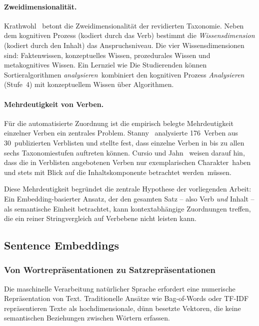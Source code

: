 \paragraph{Zweidimensionalität.}

Krathwohl~\cite{krathwohl2002revision} betont die Zweidimensionalität der revidierten Taxonomie.
Neben dem kognitiven Prozess (kodiert durch das Verb) bestimmt die \emph{Wissensdimension} (kodiert durch den Inhalt) das Anspruchsniveau.
Die vier Wissensdimensionen sind: Faktenwissen, konzeptuelles Wissen, prozedurales Wissen und metakognitives Wissen.
Ein Lernziel wie \glqq Die Studierenden können Sortieralgorithmen \emph{analysieren}\grqq\ kombiniert den kognitiven Prozess \emph{Analysieren} (Stufe~4) mit konzeptuellem Wissen über Algorithmen.

\paragraph{Mehrdeutigkeit von Verben.}

Für die automatisierte Zuordnung ist die empirisch belegte Mehrdeutigkeit einzelner Verben ein zentrales Problem.
Stanny~\cite{stanny2016reevaluating} analysierte 176~Verben aus 30~publizierten Verblisten und stellte fest, dass einzelne Verben in bis zu allen sechs Taxonomiestufen auftreten können.
Cursio und Jahn~\cite{cursio2013leitfaden} weisen darauf hin, dass die in Verblisten angebotenen Verben \glqq nur exemplarischen Charakter\grqq\ haben und \glqq stets mit Blick auf die Inhaltskomponente betrachtet werden\grqq\ müssen.

Diese Mehrdeutigkeit begründet die zentrale Hypothese der vorliegenden Arbeit: Ein Embedding-basierter Ansatz, der den gesamten Satz -- also Verb \emph{und} Inhalt -- als semantische Einheit betrachtet, kann kontextabhängige Zuordnungen treffen, die ein reiner Stringvergleich auf Verbebene nicht leisten kann.

%
\subsection{Sentence Embeddings}\label{sec:grundlagen-embeddings}

\subsubsection{Von Wortrepräsentationen zu Satzrepräsentationen}

Die maschinelle Verarbeitung natürlicher Sprache erfordert eine numerische Repräsentation von Text.
Traditionelle Ansätze wie Bag-of-Words oder TF-IDF repräsentieren Texte als hochdimensionale, dünn besetzte Vektoren, die keine semantischen Beziehungen zwischen Wörtern erfassen.

